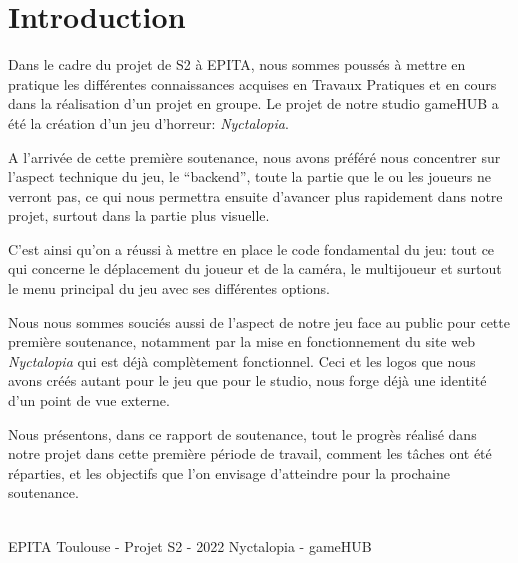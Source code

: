 \section{Introduction}
\setlength{\parindent}{5ex}
Dans le cadre du projet de S2 à EPITA, nous sommes poussés à mettre en pratique les différentes connaissances acquises en Travaux Pratiques et en cours dans la réalisation d'un projet en groupe.
Le projet de notre studio gameHUB a été la création d'un jeu d'horreur: \emph{Nyctalopia}.


A l'arrivée de cette première soutenance, nous avons préféré nous concentrer sur l'aspect technique du jeu, le ``backend'', toute la partie que le ou les joueurs ne verront pas, ce qui nous permettra ensuite d'avancer plus rapidement dans notre projet, surtout dans la partie plus visuelle.

C'est ainsi qu'on a réussi à mettre en place le code fondamental du jeu: tout ce qui concerne le déplacement du joueur et de la caméra, le multijoueur et surtout le menu principal du jeu avec ses différentes options.

Nous nous sommes souciés aussi de l'aspect de notre jeu face au public pour cette première soutenance, notamment par la mise en fonctionnement du site web \emph{Nyctalopia} qui est déjà complètement fonctionnel. Ceci et les logos que nous avons créés autant pour le jeu que pour le studio, nous forge déjà une identité d'un point de vue externe.

Nous présentons, dans ce rapport de soutenance, tout le progrès réalisé dans notre projet dans cette première période de travail, comment les tâches ont été réparties, et les objectifs que l'on envisage d'atteindre pour la prochaine soutenance.

\vfill
\noindent\makebox[\linewidth]{\rule{.8\paperwidth}{.6pt}}\\[0.2cm]
EPITA Toulouse - Projet S2 - 2022 \hfill Nyctalopia - gameHUB
\noindent\makebox[\linewidth]{\rule{.8\paperwidth}{.6pt}}

\newpage
